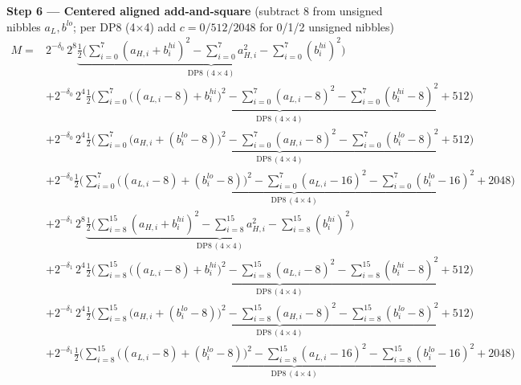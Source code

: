 \documentclass[fleqn]{article}
\newcommand{\DPop}[3]{\mathrm{DP#1}\,(#2\!\times\!#3)}
\begin{document}
\textbf{Step 6 --- Centered aligned add-and-square}\quad
{\small(subtract $8$ from unsigned nibbles $a_L,b^{lo}$; per DP8 (4$\times$4) add $c=0/512/2048$ for 0/1/2 unsigned nibbles)}
{\small
\begin{align*}
M = {}
  & 2^{-\delta_0}\,2^{8}\underbrace{\tfrac12\Big(\sum_{i=0}^{7}(a_{H,i}{+}b_i^{hi})^2 - \sum_{i=0}^{7}a_{H,i}^2 - \sum_{i=0}^{7}(b_i^{hi})^2\Big)}_{\DPop{8}{4}{4}} \\[0.15em]
  & + 2^{-\delta_0}\,2^{4}\underbrace{\tfrac12\Big(\sum_{i=0}^{7}\big((a_{L,i}{-}8){+}b_i^{hi}\big)^2 - \sum_{i=0}^{7}(a_{L,i}{-}8)^2 - \sum_{i=0}^{7}(b_i^{hi}{-}8)^2 + 512\Big)}_{\DPop{8}{4}{4}} \\[0.15em]
  & + 2^{-\delta_0}\,2^{4}\underbrace{\tfrac12\Big(\sum_{i=0}^{7}\big(a_{H,i}{+}(b_i^{lo}{-}8)\big)^2 - \sum_{i=0}^{7}(a_{H,i}{-}8)^2 - \sum_{i=0}^{7}(b_i^{lo}{-}8)^2 + 512\Big)}_{\DPop{8}{4}{4}} \\[0.15em]
  & + 2^{-\delta_0}\underbrace{\tfrac12\Big(\sum_{i=0}^{7}\big((a_{L,i}{-}8){+}(b_i^{lo}{-}8)\big)^2 - \sum_{i=0}^{7}(a_{L,i}{-}16)^2 - \sum_{i=0}^{7}(b_i^{lo}{-}16)^2 + 2048\Big)}_{\DPop{8}{4}{4}} \\[0.15em]
  & + 2^{-\delta_1}\,2^{8}\underbrace{\tfrac12\Big(\sum_{i=8}^{15}(a_{H,i}{+}b_i^{hi})^2 - \sum_{i=8}^{15}a_{H,i}^2 - \sum_{i=8}^{15}(b_i^{hi})^2\Big)}_{\DPop{8}{4}{4}} \\[0.15em]
  & + 2^{-\delta_1}\,2^{4}\underbrace{\tfrac12\Big(\sum_{i=8}^{15}\big((a_{L,i}{-}8){+}b_i^{hi}\big)^2 - \sum_{i=8}^{15}(a_{L,i}{-}8)^2 - \sum_{i=8}^{15}(b_i^{hi}{-}8)^2 + 512\Big)}_{\DPop{8}{4}{4}} \\[0.15em]
  & + 2^{-\delta_1}\,2^{4}\underbrace{\tfrac12\Big(\sum_{i=8}^{15}\big(a_{H,i}{+}(b_i^{lo}{-}8)\big)^2 - \sum_{i=8}^{15}(a_{H,i}{-}8)^2 - \sum_{i=8}^{15}(b_i^{lo}{-}8)^2 + 512\Big)}_{\DPop{8}{4}{4}} \\[0.15em]
  & + 2^{-\delta_1}\underbrace{\tfrac12\Big(\sum_{i=8}^{15}\big((a_{L,i}{-}8){+}(b_i^{lo}{-}8)\big)^2 - \sum_{i=8}^{15}(a_{L,i}{-}16)^2 - \sum_{i=8}^{15}(b_i^{lo}{-}16)^2 + 2048\Big)}_{\DPop{8}{4}{4}}
\end{align*}
}
\end{document}
